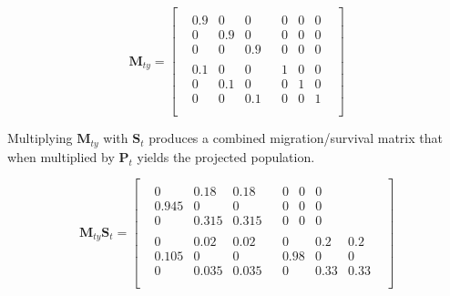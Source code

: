 \documentclass[12pt]{article}
\begin{document}
\begin{equation}
\mathbf{M}_{ty} =
\begin{bmatrix}
\begin{array}{c|c}
\begin{matrix} 0.9 & 0 & 0 \\ 0 & 0.9 & 0 \\ 0 & 0 & 0.9 \end{matrix} &
\begin{matrix} 0 & 0 & 0 \\ 0 & 0 & 0 \\ 0 & 0 & 0 \end{matrix} \\
\hline
\begin{matrix} 0.1 & 0 & 0 \\ 0 & 0.1 & 0 \\ 0 & 0 & 0.1 \end{matrix} &
\begin{matrix} 1 & 0 & 0 \\ 0 & 1 & 0 \\ 0 & 0 & 1 \end{matrix} \\
\end{array}
\end{bmatrix}
\end{equation}

Multiplying \(\mathbf{M}_{ty}\) with \(\mathbf{S}_t\) produces a
combined migration/survival matrix that when multiplied by
\(\mathbf{P}_t\) yields the projected population.

\begin{equation}
\mathbf{M}_{ty}\mathbf{S}_t = 
\begin{bmatrix}
\begin{array}{c|c}

\begin{matrix} 0 & 0.18 & 0.18 \\ 0.945 & 0 & 0 \\ 0 & 0.315 & 0.315 \end{matrix} &
\begin{matrix} 0 & 0 & 0 \\ 0 & 0 & 0 \\ 0 & 0 & 0 \end{matrix} \\
\hline
\begin{matrix} 0 & 0.02 & 0.02 \\ 0.105 & 0 & 0 \\ 0 & 0.035 & 0.035  \end{matrix} &
\begin{matrix} 0 & 0.2 & 0.2 \\ 0.98 & 0 & 0 \\ 0 & 0.33 & 0.33 \end{matrix} \\
\end{array}
\end{bmatrix}
\end{equation}
\end{document}

